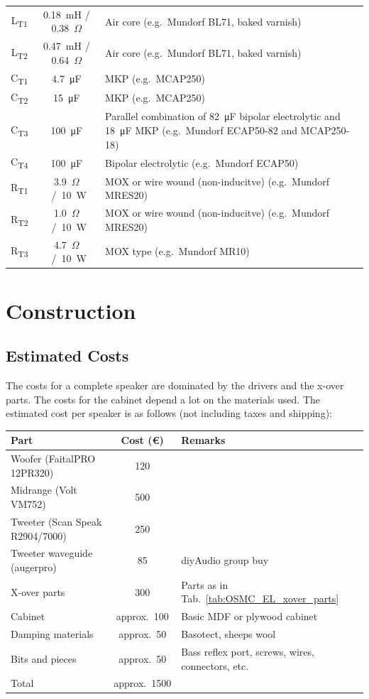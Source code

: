 \documentclass[12pt,a4paper]{article}
\providecommand{\tabl}[1]{Tab.~\ref{tab:#1}}
\providecommand{\inductor}[1]{L\textsubscript{#1}}
\providecommand{\capacitor}[1]{C\textsubscript{#1}}
\providecommand{\resistor}[1]{R\textsubscript{#1}}
\providecommand{\Ohm}{$\Omega$}
\begin{document}
\begin{table}[p]
\begin{tabular}{ccp{}}
\inductor{T1}	& \SI{0.18}{mH} / \SI{0.38}{\Ohm}	& Air core (e.g.~Mundorf BL71, baked varnish)\\
\inductor{T2}	& \SI{0.47}{mH} / \SI{0.64}{\Ohm}	& Air core (e.g.~Mundorf BL71, baked varnish)\\
\capacitor{T1}	& \SI{4.7}{\micro F}			& MKP (e.g.~MCAP250)\\
\capacitor{T2}	& \SI{15}{\micro F}			& MKP (e.g.~MCAP250)\\
\capacitor{T3}	& \SI{100}{\micro F}			& Parallel combination of \SI{82}{\micro F} bipolar electrolytic and \SI{18}{\micro F} MKP (e.g.~Mundorf ECAP50-82 and MCAP250-18)\\
\capacitor{T4}	& \SI{100}{\micro F}			& Bipolar electrolytic (e.g.~Mundorf ECAP50)\\
\resistor{T1}	& \SI{3.9}{\Ohm} / \SI{10}{W}		& MOX or wire wound (non-inducitve) (e.g.~Mundorf MRES20)\\
\resistor{T2}	& \SI{1.0}{\Ohm} / \SI{10}{W}		& MOX or wire wound (non-inducitve) (e.g.~Mundorf MRES20)\\
\resistor{T3}	& \SI{4.7}{\Ohm} / \SI{10}{W}		& MOX type (e.g.~Mundorf MR10)\\
\bottomrule
\end{tabular}
\end{table}



\section{Construction}

\subsection{Estimated Costs}
The costs for a complete speaker are dominated by the drivers and the x-over parts. The costs for the cabinet depend a lot on the materials used. The estimated cost per speaker is as follows (not including taxes and shipping):

\begin{tabular}{lcp{}} 
\toprule
Part & Cost (\euro) & Remarks\\ 
\midrule 
Woofer (FaitalPRO 12PR320)	&	120	\\
Midrange (Volt VM752)		&	500 \\
Tweeter (Scan Speak R2904/7000)	&	250	\\
Tweeter waveguide (augerpro)	&	85	& diyAudio group buy\cite{augerpro_groupbuy} \\
X-over parts			&	300	& Parts as in \tabl{OSMC_EL_xover_parts} \\
Cabinet				&	approx.~100	& Basic MDF or plywood cabinet \\
Damping materials		&	approx.~50	& Basotect, sheeps wool \\
Bits and pieces			&	approx.~50 	& Bass reflex port, screws, wires, connectors, etc. \\
\midrule 
Total				&	approx.~1500 \\
\bottomrule
\end{tabular}
\end{document}
